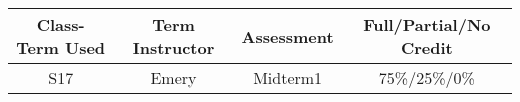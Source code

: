 \begin{outcomes}
	\begin{center}
		\begin{tabular}{cccc}
			\hline\hline
			Class-Term Used & Term Instructor & Assessment & Full/Partial/No Credit \\
			\hline
			S17 & Emery & Midterm1 & 75\%/25\%/0\%\\    %
			\hline
		\end{tabular}
	\end{center}
\end{outcomes}

\begin{comments}


\end{comments}
